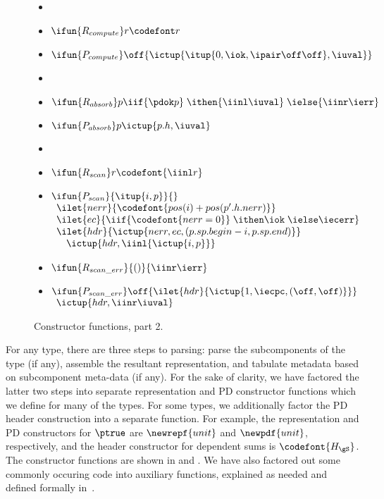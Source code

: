 \begin{figure}
\begin{itemize}
\item[] %
\item[] $\ifun{R_{compute}} r {\codefont r}$
\item[] $\ifun{P_{compute}} \off {\ictup{\itup{0,\iok,\ipair \off \off},\iuval}}$

\item[] %
\item[] $\ifun {R_{absorb}} p {\iif {\pdok p}\; 
    \ithen {\iinl \iuval}\; \ielse {\iinr \ierr}}$
\item[] $\ifun {P_{absorb}} p {\ictup{p.h,\iuval}}$

\item[] %
\item[] $\ifun{R_{scan}} r  {\codefont{\iinl r}}$
\item[] $\ifun{P_{scan}} {\itup{i,p}} {}$ \\
$\begin{array}{l}
\ilet {nerr} {\codefont{pos(i) + pos(p'.h.nerr)}}\\
\ilet {ec} {\iif {\codefont{nerr = 0}}\; \ithen \iok\; \ielse \iecerr} \\
\ilet {hdr} {\ictup{nerr,ec,(p.sp.begin - i,p.sp.end)}} \\
\quad \ictup{hdr,\iinl {\ictup{i,p}}}
\end{array}$

\item[] $\ifun {R_{scan\_err}} {()} {\iinr \ierr}$
\item[] $\ifun {P_{scan\_err}} \off {\ilet {hdr} {\ictup{1,\iecpc,(\off,\off)}}}$\\
  \verb+ +$\ictup{hdr,\iinr \iuval}$
\end{itemize}
\caption{Constructor functions, part 2.}
\label{fig:cons-funs-cont}
\end{figure}

For any type, there are three steps to parsing: parse the
subcomponents of the type (if any), assemble the resultant
representation, and tabulate metadata based on subcomponent meta-data
(if any). For the sake of clarity, we have factored the latter two
steps into separate representation and PD constructor functions which
we define for many of the types. For some types, we additionally factor the PD
header construction into a separate function. For example, the
representation and PD constructors for $\ptrue$ are $\newrepf {unit}$
and $\newpdf {unit}$, respectively, and the header constructor for
dependent sums is ${\codefont{H_{\gS}}}$. The constructor functions are shown in
 and . We have also
factored out some commonly occuring code into auxiliary functions,
explained as needed and defined formally in~.

